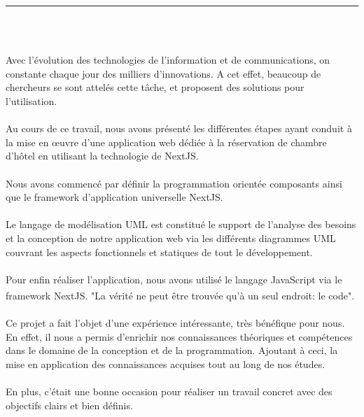 \documentclass[12pt]{report}
\begin{document}
\vspace*{-0.2in}

\begin{center}
    {\color{Black} \rule{5.5in}{1.4mm} }\\
    \vspace{0.1in}
    \scshape{\fontsize{34}{46}{\bfseries{\color{Black}{Conclusion générale}}}}
    \\
    \vspace{0.5in}
\end{center}
\hspace*{0.16in}
Avec l’évolution des technologies de l’information et de communications, on constante chaque jour des milliers d’innovations. A cet effet, beaucoup de chercheurs se sont attelés cette tâche, et proposent des solutions pour l’utilisation.
\\\\
\hspace*{0.16in}
Au cours de ce travail, nous avons présenté les différentes étapes ayant conduit à la mise en œuvre d’une application web dédiée à la réservation de chambre d’hôtel en utilisant la technologie de NextJS.
\\\\
\hspace*{0.16in}
Nous avons commencé par définir la programmation orientée composants ainsi que le framework d’application universelle NextJS.
\\\\
\hspace*{0.16in}
Le langage de modélisation UML est constitué le support de l’analyse des besoins et la conception de notre application web via les différents diagrammes UML couvrant les aspects fonctionnels et statiques de tout le développement.
\\\\
\hspace*{0.16in}
Pour enfin réaliser l’application, nous avons utilisé le langage JavaScript via le framework NextJS. "La vérité ne peut être trouvée qu’à un seul endroit: le code". \textsuperscript{\cite{martin2018clean}}
\\\\
\hspace*{0.16in}
Ce projet a fait l’objet d’une expérience intéressante, très bénéfique pour nous. En effet, il nous a permis d’enrichir nos connaissances théoriques et compétences dans le domaine de la conception et de la programmation. Ajoutant à ceci, la mise en application des connaissances acquises tout au long de nos études.
\\\\
\hspace*{0.16in}
En plus, c’était une bonne occasion pour réaliser un travail concret avec des objectifs clairs et bien définis. 

\newpage


\end{document}
